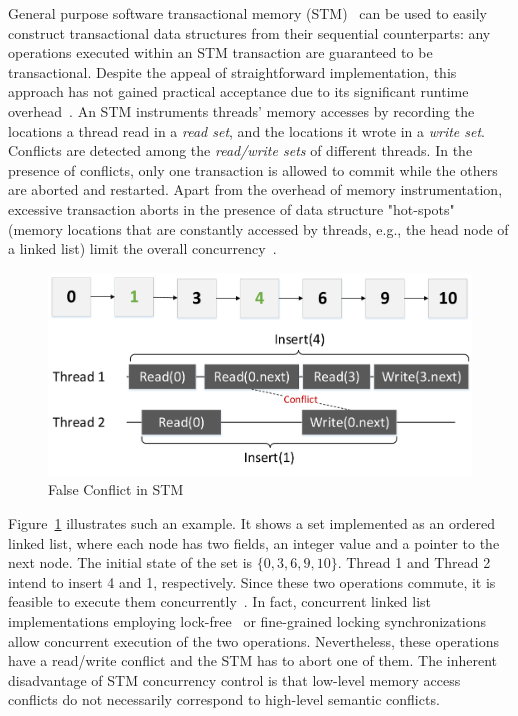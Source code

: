 \documentclass[10pt,conference,compsocconf]{IEEEtran}
\begin{document}
General purpose software transactional memory (STM)~\cite{shavit1997software,herlihy2003software} can be used to easily construct transactional data structures from their sequential counterparts: any operations executed within an STM transaction are guaranteed to be transactional.
Despite the appeal of straightforward implementation, this approach has not gained practical acceptance due to its significant runtime overhead~\cite{cascaval2008software}.
An STM instruments threads' memory accesses by recording the locations a thread read in a \emph{read set}, and the locations it wrote in a \emph{write set}. 
Conflicts are detected among the \emph{read/write sets} of different threads. 
In the presence of conflicts, only one transaction is allowed to commit while the others are aborted and restarted.
Apart from the overhead of memory instrumentation, excessive transaction aborts in the presence of data structure "hot-spots" (memory locations that are constantly accessed by threads, e.g., the head node of a linked list) limit the overall concurrency~\cite{herlihy2008transactional}.
\begin{figure}[h]
    \centering
    \includegraphics[width=0.8\columnwidth]{figure/stmconflict.pdf}
    \caption{False Conflict in STM}
    \label{fig:stmconflict}
\end{figure}
Figure~\ref{fig:stmconflict} illustrates such an example.
It shows a set implemented as an ordered linked list, where each node has two fields, an integer value and a pointer to the next node.
The initial state of the set is $\{0,3,6,9,10\}$.
Thread 1 and Thread 2 intend to insert 4 and 1, respectively.
Since these two operations commute, it is feasible to execute them concurrently~\cite{clements2015scalable}.
In fact, concurrent linked list implementations employing lock-free~\cite{michael2002high} or fine-grained locking synchronizations~\cite{bayer1977concurrency} allow concurrent execution of the two operations.
Nevertheless, these operations have a read/write conflict and the STM has to abort one of them. 
The inherent disadvantage of STM concurrency control is that low-level memory access conflicts do not necessarily correspond to high-level semantic conflicts.
\end{document}
